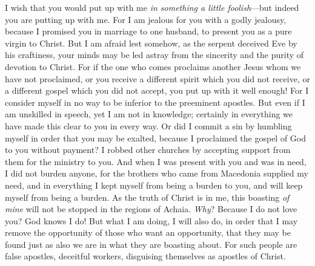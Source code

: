 \begin{biblechapter} %
 I wish that you would put up with me \textit{in something a little foolish}—but indeed you are putting up with me.
\verse For I am jealous for you with a godly jealousy, because I promised you in marriage to one husband, to present you as a pure virgin to Christ.
\verse But I am afraid lest somehow, as the serpent deceived Eve by his craftiness, your minds may be led astray from the sincerity and the purity of devotion to Christ.
\verse For if the one who comes proclaims another Jesus whom we have not proclaimed, or you receive a different spirit which you did not receive, or a different gospel which you did not accept, you put up with it well enough!
\verse For I consider myself in no way to be inferior to the preeminent apostles.
\verse But even if I am unskilled in speech, yet I am not in knowledge; certainly in everything we have made this clear to you in every way.
\verse Or did I commit a sin by humbling myself in order that you may be exalted, because I proclaimed the gospel of God to you without payment?
\verse I robbed other churches by accepting support from them for the ministry to you.
\verse And when I was present with you and was in need, I did not burden anyone, for the brothers who came from Macedonia supplied my need, and in everything I kept myself from being a burden to you, and will keep myself from being a burden.
\verse As the truth of Christ is in me, this boasting \textit{of mine} will not be stopped in the regions of Achaia.
\verse \textit{Why}? Because I do not love you? God knows I do!
\verse But what I am doing, I will also do, in order that I may remove the opportunity of those who want an opportunity, that they may be found just as also we are in what they are boasting about.
\verse For such people are false apostles, deceitful workers, disguising themselves as apostles of Christ.

\end{biblechapter}
